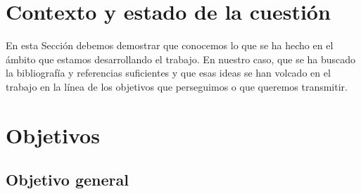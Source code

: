 \documentclass[11pt,a4paper,spanish]{book}
\begin{document}






\chapter{Contexto y estado de la cuestión}

En esta Sección debemos demostrar que conocemos lo que se ha hecho en el ámbito que estamos desarrollando el trabajo. En nuestro caso, que se ha buscado la bibliografía y referencias suficientes y que esas ideas se han volcado en el trabajo en la línea de los objetivos que perseguimos o que queremos transmitir.


\chapter{Objetivos}


\section{Objetivo general}
\end{document}
